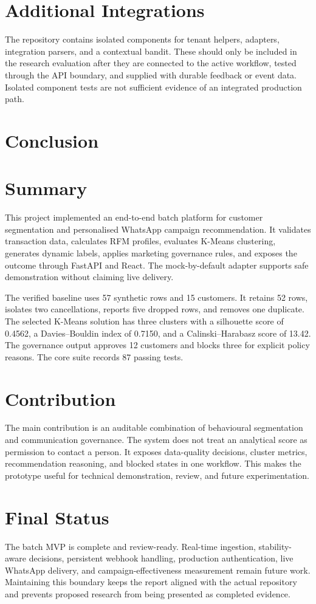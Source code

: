 \documentclass[12pt,a4paper]{report}
\begin{document}
\section{Additional Integrations}
The repository contains isolated components for tenant helpers, adapters, integration parsers, and a contextual bandit. These should only be included in the research evaluation after they are connected to the active workflow, tested through the API boundary, and supplied with durable feedback or event data. Isolated component tests are not sufficient evidence of an integrated production path.

\section{Conclusion}
\section{Summary}
This project implemented an end-to-end batch platform for customer segmentation and personalised WhatsApp campaign recommendation. It validates transaction data, calculates RFM profiles, evaluates K-Means clustering, generates dynamic labels, applies marketing governance rules, and exposes the outcome through FastAPI and React. The mock-by-default adapter supports safe demonstration without claiming live delivery.

The verified baseline uses 57 synthetic rows and 15 customers. It retains 52 rows, isolates two cancellations, reports five dropped rows, and removes one duplicate. The selected K-Means solution has three clusters with a silhouette score of 0.4562, a Davies--Bouldin index of 0.7150, and a Calinski--Harabasz score of 13.42. The governance output approves 12 customers and blocks three for explicit policy reasons. The core suite records 87 passing tests.

\section{Contribution}
The main contribution is an auditable combination of behavioural segmentation and communication governance. The system does not treat an analytical score as permission to contact a person. It exposes data-quality decisions, cluster metrics, recommendation reasoning, and blocked states in one workflow. This makes the prototype useful for technical demonstration, review, and future experimentation.

\section{Final Status}
The batch MVP is complete and review-ready. Real-time ingestion, stability-aware decisions, persistent webhook handling, production authentication, live WhatsApp delivery, and campaign-effectiveness measurement remain future work. Maintaining this boundary keeps the report aligned with the actual repository and prevents proposed research from being presented as completed evidence.
\end{document}
